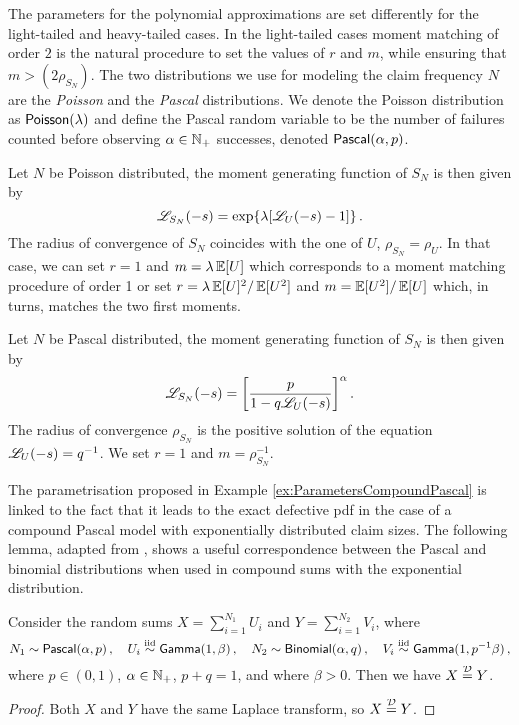 The parameters for the polynomial approximations are set differently for the light-tailed and heavy-tailed cases. In the light-tailed cases moment matching of order $2$ is the natural procedure to set the values of $r$ and $m$, while ensuring that $m>(2 \rho_{S_N})$. The two distributions we use for modeling the claim frequency $N$ are the \emph{Poisson} and the \emph{Pascal} distributions. We denote the Poisson distribution as $\mathsf{Poisson}(\lambda)$ and define the Pascal random variable to be the number of failures counted before observing $\alpha \in \mathbb{N}_+$ successes, denoted $\mathsf{Pascal}(\alpha,p)$.
\begin{example}\label{ex:ParametersCompoundPoisson}
Let $N$ be Poisson distributed, the moment generating function of $S_N$ is then given by
\[
\mathscr{L}_{S_N}(-s)=\exp \{ \lambda [ \mathscr{L}_{U}(-s)-1 ] \} \,.
\]
The radius of convergence of $S_N$ coincides with the one of $U$, $\rho_{S_N}=\rho_U$. In that case, we can set $r=1$ and $m=\lambda\operatorname{{\mathbb E}}[U]$ which corresponds to a moment matching procedure of order 1 or set $r=\lambda\operatorname{{\mathbb E}}[U]^2/\operatorname{{\mathbb E}}[U^2]$ and $m=\operatorname{{\mathbb E}}[U^2]/\operatorname{{\mathbb E}}[U]$ which, in turns, matches the two first moments.
\end{example}
\begin{example}\label{ex:ParametersCompoundPascal}
Let $N$ be Pascal distributed, the moment generating function of $S_N$ is then given by
$$
\mathscr{L}_{S_N}(-s)=\left[\frac{p}{1-q\mathscr{L}_{U}(-s)}\right]^{\alpha}.
$$
The radius of convergence $\rho_{S_N}$ is the positive solution of the equation $\mathscr{L}_{U}(-s)=q^{-1}$. We set $r=1$ and $m=\rho_{S_N}^{-1}$.
\end{example}
The parametrisation proposed in Example \ref{ex:ParametersCompoundPascal} is linked to the fact that it leads to the exact defective pdf in the case of a compound Pascal model with exponentially distributed claim sizes.
 The following lemma, adapted from \cite{PaWi81}, shows a useful correspondence between the Pascal and binomial distributions when used in compound sums with the exponential distribution.
\begin{lemma} \label{lemma:BinomialPascalEquivalence}
Consider the random sums $X = \sum_{i=1}^{N_1} U_i$ and $Y = \sum_{i=1}^{N_2} V_i$, where
\[
N_1 \sim \mathsf{Pascal}(\alpha,p) \,, \quad  U_i \overset{\smash{\mathrm{iid}}}{\sim} \mathsf{Gamma}(1,\beta) \,, \quad  N_2 \sim \mathsf{Binomial}(\alpha,q)  \,, \quad V_i \overset{\smash{\mathrm{iid}}}{\sim} \mathsf{Gamma}(1,p^{-1} \beta) \,,
\]
where $p \in (0,1)$, $\alpha \in \mathbb{N}_+$, $p + q = 1$, and where $\beta > 0$.
Then we have $X \stackrel{\smash{\mathcal{D}}}{=} Y$.
\end{lemma}
\begin{proof}
Both $X$ and $Y$ have the same Laplace transform, so $X \stackrel{\smash{\mathcal{D}}}{=} Y$.
\end{proof}

